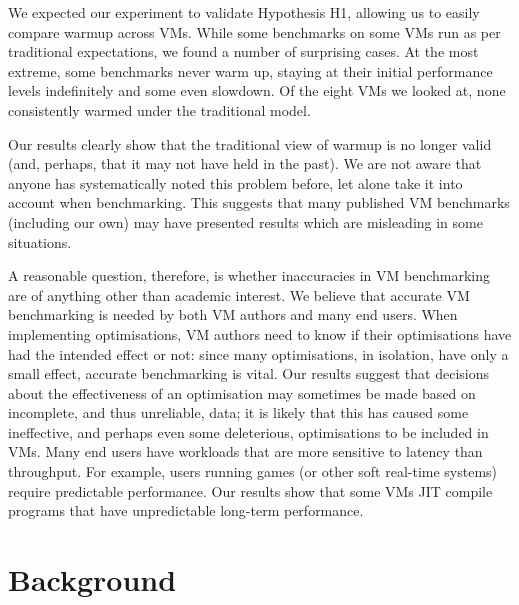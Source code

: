 \documentclass[a4paper,UKenglish]{lipics}
\begin{document}
We expected our experiment to validate Hypothesis H1, allowing us to
easily compare warmup across VMs. While some benchmarks on some VMs run as per
traditional expectations, we found a number of surprising cases. At
the most extreme, some benchmarks never warm up, staying at their initial performance
levels indefinitely and some even slowdown. Of the eight
VMs we looked at, none consistently warmed under the traditional model.

Our results clearly show that the traditional view of warmup is no longer valid (and, perhaps,
that it may not have held in the past). We are not aware that anyone has systematically noted this
problem before, let alone take it into account when benchmarking. This suggests
that many published VM benchmarks (including our own) may have presented
results which are misleading in some situations.

A reasonable question, therefore,  is whether inaccuracies in VM benchmarking are of anything
other than academic interest. We believe that accurate VM benchmarking is needed
by both VM authors and many end users. When
implementing optimisations, VM authors need to know if their optimisations have
had the intended effect or not: since many optimisations, in isolation, have only a
small effect, accurate benchmarking is vital. Our results suggest that decisions
about the effectiveness of an optimisation may sometimes be made based on
incomplete, and thus unreliable, data;
it is likely that this has caused some ineffective, and perhaps even some deleterious,
optimisations to be included in VMs. Many end users have workloads that are more
sensitive to latency than throughput. For example, users running games (or other
soft real-time systems) require predictable performance. Our results show that some
VMs JIT compile programs that have unpredictable long-term performance.

%


\section{Background}
\label{sec:warmup}
\end{document}
